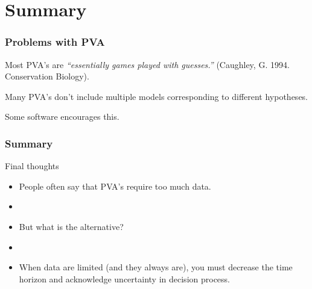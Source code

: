 \documentclass[color=usenames,dvipsnames]{beamer}\usepackage[]{graphicx}\usepackage[]{xcolor}
\begin{document}
\section{Summary}



\begin{frame}
  \frametitle{Problems with PVA}
  \large
  Most PVA's are {\it ``essentially games played with
    guesses.''} (Caughley, G. 1994. Conservation Biology). \par
  \pause
  \vspace{0.5cm}
  Many PVA's don't include multiple models corresponding to different
  hypotheses. \par
  \pause
  \vspace{0.5cm}
  {Some software encourages this. \\}
\end{frame}




\begin{frame}
  \frametitle{Summary}
  \large
  {Final thoughts}
  \begin{itemize}%
    \item<1-> People often say that PVA's require too much data.
    \item[]
    \item<2-> But what is the alternative?
    \item[]
    \item<3-> When data are limited (and they always are), you must
      decrease the time horizon and acknowledge uncertainty in decision process. 
  \end{itemize}
\end{frame}
\end{document}
